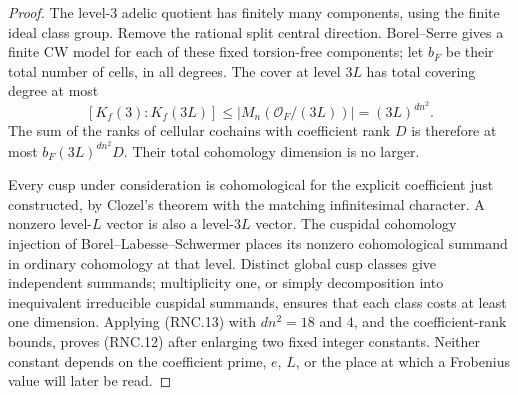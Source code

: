 \documentclass[11pt,a4paper]{article}
\numberwithin{equation}{section}
\theoremstyle{remark}\newtheorem{remark}[theorem]{Remark}
\begin{document}
\begin{proof}
The level-$3$ adelic quotient has finitely many components,
using the finite ideal class group.  Remove the rational
split central direction.  Borel--Serre gives a finite CW
model for each of these fixed torsion-free components; let
$b_F$ be their total number of cells, in all degrees.
The cover at level $3L$ has total covering degree at most
\[
 [K_f(3):K_f(3L)]\leq
 |M_n(\mathcal O_F/(3L))|=(3L)^{dn^2}.                         \tag{RNC.13}
\]
The sum of the ranks of cellular cochains with coefficient
rank $D$ is therefore at most $b_F(3L)^{dn^2}D$.
Their total cohomology dimension is no larger.

Every cusp under consideration is cohomological for the
explicit coefficient just constructed, by Clozel's theorem
with the matching infinitesimal character.  A nonzero
level-$L$ vector is also a level-$3L$ vector.  The cuspidal
cohomology injection of Borel--Labesse--Schwermer places its
nonzero cohomological summand in ordinary cohomology at
that level.  Distinct global cusp classes give independent
summands; multiplicity one, or simply decomposition into
inequivalent irreducible cuspidal summands, ensures that
each class costs at least one dimension.  Applying (RNC.13)
with $dn^2=18$ and $4$, and the coefficient-rank bounds,
proves (RNC.12) after enlarging two fixed integer constants.
Neither constant depends on the coefficient prime, $e$, $L$,
or the place at which a Frobenius value will later be read.
\end{proof}

\end{document}
